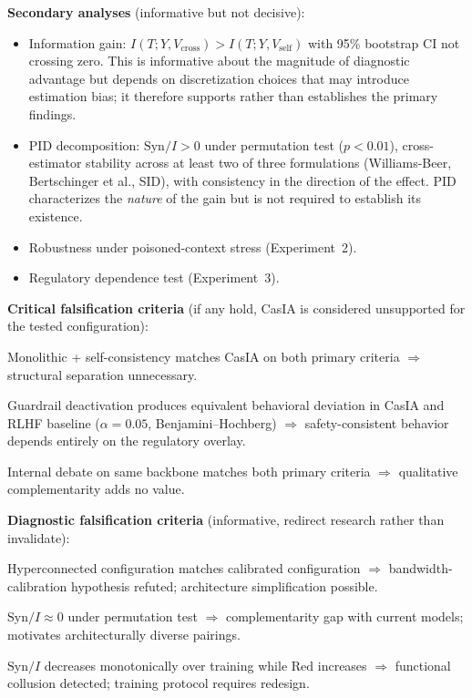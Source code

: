 \documentclass[11pt,a4paper]{article}
\theoremstyle{definition}
\begin{document}
\textbf{Secondary analyses} (informative but not decisive):
\begin{itemize}[leftmargin=*,itemsep=2pt]
\item Information gain: $I(T; Y, V_\text{cross}) > I(T; Y, V_\text{self})$ with 95\% bootstrap CI not crossing zero. This is informative about the magnitude of diagnostic advantage but depends on discretization choices that may introduce estimation bias; it therefore supports rather than establishes the primary findings.
\item PID decomposition: $\mathrm{Syn}/I > 0$ under permutation test ($p < 0.01$), cross-estimator stability across at least two of three formulations (Williams-Beer, Bertschinger et al., SID), with consistency in the direction of the effect. PID characterizes the \emph{nature} of the gain but is not required to establish its existence.
\item Robustness under poisoned-context stress (Experiment~2).
\item Regulatory dependence test (Experiment~3).
\end{itemize}

\textbf{Critical falsification criteria} (if any hold, CasIA is considered unsupported for the tested configuration):
\begin{description}[leftmargin=*,itemsep=3pt]
\item[F1] Monolithic + self-consistency matches CasIA on both primary criteria $\Rightarrow$ structural separation unnecessary.
\item[F3] Guardrail deactivation produces equivalent behavioral deviation in CasIA and RLHF baseline ($\alpha=0.05$, Benjamini--Hochberg) $\Rightarrow$ safety-consistent behavior depends entirely on the regulatory overlay.
\item[F5] Internal debate on same backbone matches both primary criteria $\Rightarrow$ qualitative complementarity adds no value.
\end{description}

\textbf{Diagnostic falsification criteria} (informative, redirect research rather than invalidate):
\begin{description}[leftmargin=*,itemsep=3pt]
\item[F2] Hyperconnected configuration matches calibrated configuration $\Rightarrow$ bandwidth-calibration hypothesis refuted; architecture simplification possible.
\item[F4] $\mathrm{Syn}/I \approx 0$ under permutation test $\Rightarrow$ complementarity gap with current models; motivates architecturally diverse pairings.
\item[F6] $\mathrm{Syn}/I$ decreases monotonically over training while $\mathrm{Red}$ increases $\Rightarrow$ functional collusion detected; training protocol requires redesign.
\end{description}
\end{document}
